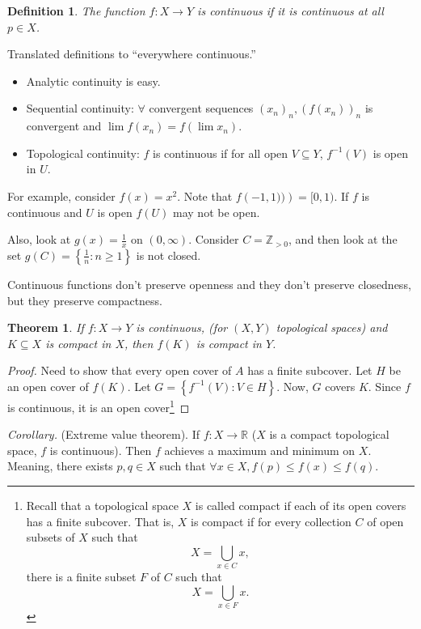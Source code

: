 \documentclass[12pt]{article}
\newtheorem*{theorem}{Theorem}
\newtheorem*{definition}{Definition}
\newcommand{\RR}{\mathbb{R}}
\begin{document}
    \begin{definition}
      The function $f: X \to Y$ is continuous if it is continuous at all $p \in X$.
    \end{definition}

    Translated definitions to ``everywhere continuous.''
    \begin{itemize}
      \item Analytic continuity is easy.
      \item Sequential continuity: $\forall$ convergent sequences $(x_n)_n, (f(x_n))_n$ is convergent and $\lim f(x_n) = f(\lim x_n)$.
      \item Topological continuity: $f$ is continuous if for all open $V \subseteq Y$, $f^{-1}(V)$ is open in $U$.
    \end{itemize}

For example, consider $f(x) = x^2$.  Note that $f\left( -1, 1))  \right) = [0, 1)$.  If $f$ is continuous and $U$ is open $f(U)$ may not be open.

Also, look at $g(x) = \frac{1}{x}$ on $(0, \infty)$.  Consider $C = \mathbb{Z}_{> 0}$, and then look at the set $g(C) = \left\{ \frac{1}{n} : n \geq 1 \right\}$ is not closed.

Continuous functions don't preserve openness and they don't preserve closedness, but they preserve compactness.

\begin{theorem}
  If $f: X \to Y$ is continuous, (for $(X, Y)$ topological spaces) and $K \subseteq X$ is compact in $X$, then $f(K)$ is compact in $Y$.
\end{theorem}

\begin{proof}
  Need to show that every open cover of $A$ has a finite subcover.  Let $H$ be an open cover of $f(K)$.  Let $G = \left\{ f^{-1}(V) : V \in H  \right\}$.  Now, $G$ covers $K$.  Since $f$ is continuous, it is an open cover\footnote{Recall that a topological space $X$ is called compact if each of its open covers has a finite subcover.  That is, $X$ is compact if for every collection $C$ of open subsets of $X$ such that 
 \[
   X = \bigcup_{x \in C} x,
   \]
  there is a finite subset $F$ of $C$ such that
  \[
    X = \bigcup_{x \in F} x.
    \]
}
\end{proof}

{\it Corollary.} (Extreme value theorem).  If $f: X \to \RR$ ($X$ is a compact topological space, $f$ is continuous).  Then $f$ achieves a maximum and minimum on $X$.  Meaning, there exists $p, q \in X$ such that $\forall x \in X, f(p) \leq f(x) \leq f(q)$.
\end{document}
